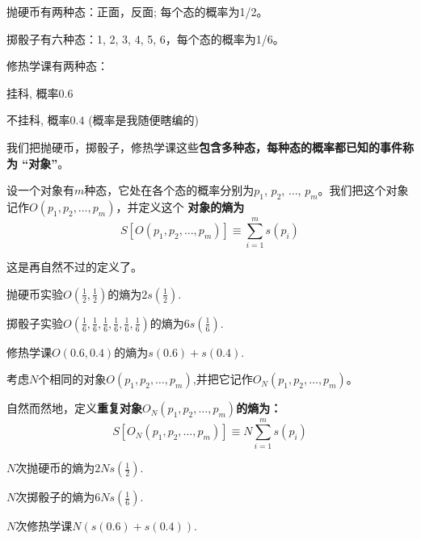 \documentclass[CJK]{beamer}
\begin{document}
\begin{frame}
\bch
\bitem
\item{抛硬币有两种态：正面，反面; 每个态的概率为1/2。

}
\item{掷骰子有六种态：1, 2, 3, 4, 5, 6，每个态的概率为1/6。

}
\item{修热学课有两种态：

挂科, 概率$0.6$ 

不挂科, 概率$0.4$  {\hskip 0.5in} {\small (\bye 概率是我随便瞎编的)}
}
\eitem

我们把抛硬币，掷骰子，修热学课这些{\bf 包含多种态，每种态的概率都已知的事件称为 “对象”}。

\ech
\end{frame}

\begin{frame}
\bch
设一个对象有$m$种态，它处在各个态的概率分别为$p_1$, $p_2$, $\ldots$, $p_m$。我们把这个对象记作$O(p_1, p_2, \ldots, p_m)$，并定义这个{\bf \blue
对象的熵为
$$S\left[O(p_1, p_2, \ldots, p_m)\right] \equiv \sum_{i=1}^m  s(p_i)$$
}

这是再自然不过的定义了。

\skiplines

\bex
{\small 
抛硬币实验$O(\frac{1}{2},\frac{1}{2})$的熵为$2s(\frac{1}{2})$.

\skipline

掷骰子实验$O(\frac{1}{6},\frac{1}{6},\frac{1}{6},\frac{1}{6},\frac{1}{6},\frac{1}{6})$的熵为$6s(\frac{1}{6})$.

\skipline

修热学课$O(0.6, 0.4)$的熵为$s(0.6)+s(0.4)$.}

\eex
\ech
\end{frame}


\begin{frame}
\bch
{\small 考虑$N$个相同的对象$O(p_1, p_2, \ldots, p_m)$,并把它记作$O_N(p_1, p_2, \ldots, p_m)$。


自然而然地，定义{\blue \bf 重复对象$O_N(p_1, p_2, \ldots, p_m)$的熵为：
$$S\left[O_N(p_1, p_2, \ldots, p_m)\right] \equiv N \sum_{i=1}^m  s(p_i)$$
}}

\bex
{\small
$N$次抛硬币的熵为$2Ns(\frac{1}{2})$.

\skipline

$N$次掷骰子的熵为$6Ns(\frac{1}{6})$.

\skipline

$N$次修热学课$N\left(s(0.6)+s(0.4)\right)$.}

\eex

\ech
\end{frame}
\end{document}
